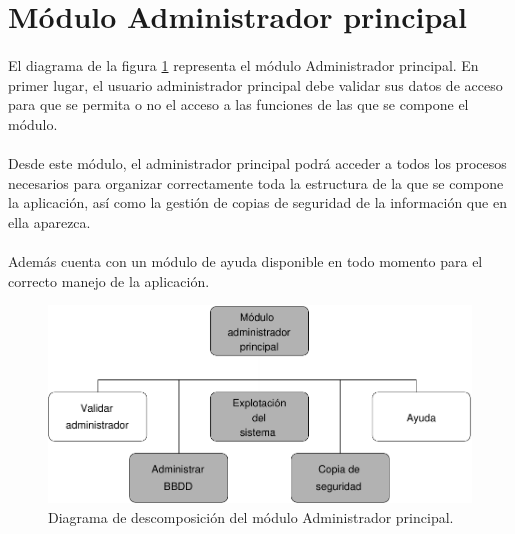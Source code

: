 \section{Módulo Administrador principal}

  \paragraph{}El diagrama de la figura
  \ref{diagramaDescomposicionAdministradorPrincipal} representa el módulo
  Administrador principal. En primer lugar, el usuario administrador principal
  debe validar sus datos de acceso para que se permita o no el acceso a las
  funciones de las que se compone el módulo.

  \paragraph{}Desde este módulo, el administrador principal podrá acceder a
  todos los procesos necesarios para organizar correctamente toda la estructura
  de la que se compone la aplicación, así como la gestión de copias de seguridad
  de la información que en ella aparezca.

  \paragraph{}Además cuenta con un módulo de ayuda disponible en todo momento
  para el correcto manejo de la aplicación.

  \begin{figure}[!ht]
    \begin{center}
      \includegraphics[]{11.Disenyo_Arquitectonico/11.2.Diagramas_Descomposicion/11.2.2.Modulo_administrador_principal/Diagramas/administrador_principal.pdf}
      \caption{Diagrama de descomposición del módulo Administrador principal.}
      \label{diagramaDescomposicionAdministradorPrincipal}
    \end{center}
  \end{figure}
